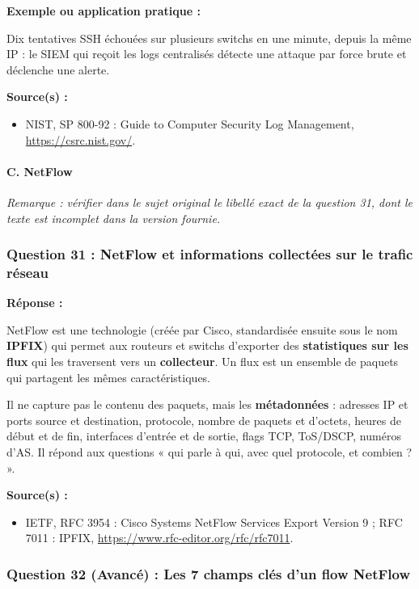 \documentclass[12pt,a4paper]{article}
\newcommand{\reponse}{\textbf{Réponse :}\par}
\newcommand{\exemple}{\textbf{Exemple ou application pratique :}\par}
\newcommand{\sources}{\textbf{Source(s) :}}
\begin{document}
\exemple
Dix tentatives SSH échouées sur plusieurs switchs en une minute, depuis
la même IP : le SIEM qui reçoit les logs centralisés détecte une
attaque par force brute et déclenche une alerte.

\sources
\begin{itemize}
    \item NIST, SP 800-92 : Guide to Computer Security Log Management,
    \url{https://csrc.nist.gov/}.
\end{itemize}

\paragraph{C. NetFlow}

\textit{Remarque : vérifier dans le sujet original le libellé
exact de la question 31, dont le texte est incomplet dans
la version fournie.}

\subsubsection*{Question 31 : NetFlow et informations collectées sur le trafic réseau}

\reponse
NetFlow est une technologie (créée par Cisco, standardisée ensuite sous
le nom \textbf{IPFIX}) qui permet aux routeurs et switchs d'exporter
des \textbf{statistiques sur les flux} qui les traversent vers un
\textbf{collecteur}. Un flux est un ensemble de paquets qui partagent
les mêmes caractéristiques.

Il ne capture pas le contenu des paquets, mais les
\textbf{métadonnées} : adresses IP et ports source et destination,
protocole, nombre de paquets et d'octets, heures de début et de fin,
interfaces d'entrée et de sortie, flags TCP, ToS/DSCP, numéros d'AS.
Il répond aux questions « qui parle à qui, avec quel protocole, et
combien ? ».

\sources
\begin{itemize}
    \item IETF, RFC 3954 : Cisco Systems NetFlow Services Export
    Version 9 ; RFC 7011 : IPFIX,
    \url{https://www.rfc-editor.org/rfc/rfc7011}.
\end{itemize}

\subsubsection*{Question 32 (Avancé) : Les 7 champs clés d'un flow NetFlow}
\end{document}
